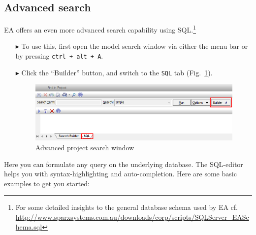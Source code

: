 \subsection{Advanced search}
\label{sect:appendix_adv_search}

EA offers an even more advanced search capability using SQL.\footnote{For some detailed insights to the general database schema used by EA cf. \\
\url{http://www.sparxsystems.com.au/downloads/corp/scripts/SQLServer_EASchema.sql}}

\begin{itemize}

\item[$\blacktriangleright$] To use this, first open the model search window via either the menu bar or by pressing \texttt{ctrl + alt + A}.

\item[$\blacktriangleright$] Click the ``Builder'' button, and switch to the \texttt{SQL} tab (Fig.~\ref{ea:builderSQLtab}). 

\begin{figure}[htbp]
\begin{center}
  \includegraphics[width=\textwidth]{ea_activateSQLSearch}
  \caption{Advanced project search window}  
  \label{ea:builderSQLtab}
\end{center}
\end{figure}

\end{itemize}

Here you can formulate any query on the underlying database. The SQL-editor helps you with syntax-highlighting and auto-completion. Here are some basic
examples to get you started:

